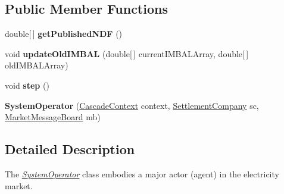\subsection*{Public Member Functions}
\begin{DoxyCompactItemize}
\item 
\hypertarget{classuk_1_1ac_1_1dmu_1_1iesd_1_1cascade_1_1market_1_1astem_1_1operators_1_1_system_operator_ad88d811a9c9e80e147a20444744ea22a}{double\mbox{[}$\,$\mbox{]} {\bfseries get\-Published\-N\-D\-F} ()}\label{classuk_1_1ac_1_1dmu_1_1iesd_1_1cascade_1_1market_1_1astem_1_1operators_1_1_system_operator_ad88d811a9c9e80e147a20444744ea22a}

\item 
\hypertarget{classuk_1_1ac_1_1dmu_1_1iesd_1_1cascade_1_1market_1_1astem_1_1operators_1_1_system_operator_ad3621c905d7cecca9b3449635e12432a}{void {\bfseries update\-Old\-I\-M\-B\-A\-L} (double\mbox{[}$\,$\mbox{]} current\-I\-M\-B\-A\-L\-Array, double\mbox{[}$\,$\mbox{]} old\-I\-M\-B\-A\-L\-Array)}\label{classuk_1_1ac_1_1dmu_1_1iesd_1_1cascade_1_1market_1_1astem_1_1operators_1_1_system_operator_ad3621c905d7cecca9b3449635e12432a}

\item 
\hypertarget{classuk_1_1ac_1_1dmu_1_1iesd_1_1cascade_1_1market_1_1astem_1_1operators_1_1_system_operator_a213ac48ac9c9bc9181208073ad02c11d}{void {\bfseries step} ()}\label{classuk_1_1ac_1_1dmu_1_1iesd_1_1cascade_1_1market_1_1astem_1_1operators_1_1_system_operator_a213ac48ac9c9bc9181208073ad02c11d}

\item 
\hypertarget{classuk_1_1ac_1_1dmu_1_1iesd_1_1cascade_1_1market_1_1astem_1_1operators_1_1_system_operator_aef3317b9d63c3c59f654439ee7c1bf4c}{{\bfseries System\-Operator} (\hyperlink{classuk_1_1ac_1_1dmu_1_1iesd_1_1cascade_1_1context_1_1_cascade_context}{Cascade\-Context} context, \hyperlink{classuk_1_1ac_1_1dmu_1_1iesd_1_1cascade_1_1market_1_1astem_1_1operators_1_1_settlement_company}{Settlement\-Company} sc, \hyperlink{classuk_1_1ac_1_1dmu_1_1iesd_1_1cascade_1_1market_1_1astem_1_1operators_1_1_market_message_board}{Market\-Message\-Board} mb)}\label{classuk_1_1ac_1_1dmu_1_1iesd_1_1cascade_1_1market_1_1astem_1_1operators_1_1_system_operator_aef3317b9d63c3c59f654439ee7c1bf4c}

\end{DoxyCompactItemize}


\subsection{Detailed Description}
The {\itshape \hyperlink{classuk_1_1ac_1_1dmu_1_1iesd_1_1cascade_1_1market_1_1astem_1_1operators_1_1_system_operator}{System\-Operator}} class embodies a major actor (agent) in the electricity market. 

